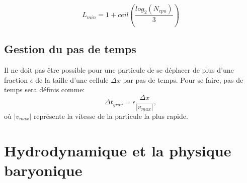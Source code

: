 \begin{equation}
L_{min} = 1 + ceil \left(\frac{log_2(N_{cpu})}{3}  \right) 
\end{equation}


%
%


%

\subsection{Gestion du pas de temps}
\label{sec:dtgrav}
Il ne doit pas être possible pour une particule de se déplacer de plus d'une fraction $\epsilon$ de la taille d'une cellule $\Delta x$ par pas de temps.
Pour se faire, pas de temps sera définis comme:
\begin{equation}
\Delta t_{grav} = \epsilon \frac{\Delta x}{|v_{max}|},
\end{equation}
où $|v_{max}|$ représente la vitesse de la particule la plus rapide.


\clearpage
\section{Hydrodynamique et la physique baryonique}
\label{sec:hydro}
%
%

